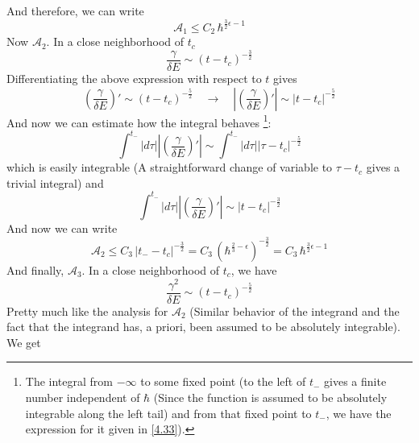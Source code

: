 \documentclass[12pt,a4paper]{article}
\begin{document}
	And therefore, we can write
	\begin{equation}
		\mathcal{A}_{1} \leq C_{2}\, \hbar^{\frac{3}{2}\epsilon - 1} \label{4.30}
	\end{equation}
	Now $\mathcal{A}_{2}$. In a close neighborhood of $t_{c}$
	\begin{equation}
		\dfrac{\gamma}{\delta E} \sim \left( t - t_{c} \right)^{-\frac{3}{2}} \label{4.31}
	\end{equation}
	Differentiating the above expression with respect to $t$ gives
	\begin{equation}
		\left( \dfrac{\gamma}{\delta E} \right)' \sim \left( t - t_{c} \right)^{-\frac{5}{2}} \quad \rightarrow \quad \left| \left( \dfrac{\gamma}{\delta E} \right)' \right| \sim \left| t - t_{c} \right|^{-\frac{5}{2}} \label{4.32}
	\end{equation}
	And now we can estimate how the integral behaves \footnote{The integral from $-\infty$ to some fixed point (to the left of $t_{-}$ gives a finite number independent of $\hbar$ (Since the function is assumed to be absolutely integrable along the left tail) and from that fixed point to $t_{-}$, we have the expression for it given in \eqref{4.33}).}:
	\begin{equation}
		\int^{t_{-}} \left| d\tau \right| \left| \left( \dfrac{\gamma}{\delta E} \right)' \right| \sim \int^{t_{-}} \left| d\tau \right| \left| \tau - t_{c} \right|^{-\frac{5}{2}} \label{4.33}
	\end{equation}
	which is easily integrable (A straightforward change of variable to $\tau - t_{c}$ gives a trivial integral) and 
	\begin{equation}
		\int^{t_{-}} \left| d\tau \right| \left| \left( \dfrac{\gamma}{\delta E} \right)' \right| \sim \left| t - t_{c} \right|^{-\frac{3}{2}} \label{4.34}
	\end{equation}
	And now we can write
	\begin{equation}
		\mathcal{A}_{2} \leq C_{3}\, \left| t_{-} - t_{c} \right|^{-\frac{3}{2}} = C_{3}\, \left( \hbar^{\frac{2}{3} - \epsilon} \right)^{-\frac{3}{2}} = C_{3}\, \hbar^{\frac{3}{2}\epsilon - 1} \label{4.35}
	\end{equation}
	And finally, $\mathcal{A}_{3}$. In a close neighborhood of $t_{c}$, we have
	\begin{equation}
		\dfrac{\gamma^{2}}{\delta E} \sim \left( t - t_{c} \right)^{-\frac{5}{2}}
	\end{equation}
	Pretty much like the analysis for $\mathcal{A}_{2}$ (Similar behavior of the integrand and the fact that the integrand has, a priori, been assumed to be absolutely integrable). We get
\end{document}
